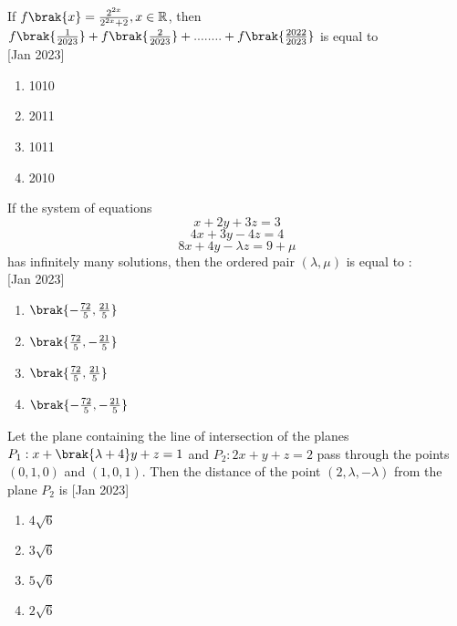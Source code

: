     \item{
     		If $f\brak{x} = \frac{2^{2x}}{2^{2x}+2}, x\in \mathbb{R}$, then $f\brak{\frac{1}{2023}}+ f\brak{\frac{2}{2023}}+........+ f\brak{\frac{2022}{2023}}$ is equal to \\ \text{ }
            \hfill
            {[Jan 2023]}
            \begin{multicols}{4}
                \begin{enumerate}
                	\item 1010
                	\item 2011
                	\item 1011
                	\item 2010
                \end{enumerate}
            \end{multicols}
        
        }
    \item{
            If the system of equations
            \[x + 2y + 3z = 3\]
            \[4x + 3y - 4z = 4\]
            \[8x + 4y - \lambda z = 9 + \mu\]
            has infinitely many solutions, then the ordered pair
            \((\lambda, \mu)\) is equal to : \\ \text{ }
           	\hfill
                {[Jan 2023]}
            
           \begin{multicols}{4}
            	\begin{enumerate}
            		\item $\brak{-\frac{72}{5},\frac{21}{5}}$
            		\item $\brak{\frac{72}{5},-\frac{21}{5}}$
            		\item $\brak{\frac{72}{5},\frac{21}{5}}$
            		\item $\brak{-\frac{72}{5},-\frac{21}{5}}$
            	\end{enumerate}
            \end{multicols}
        
        }
 	\item{
        	Let the plane containing the line of intersection of the planes $P_{1}: x + \brak{\lambda+4}y + z = 1$ and $P_{2}: 2x + y + z = 2$ pass through the points $(0, 1, 0)$ and $(1, 0, 1)$. Then the distance of the point $(2, \lambda,- \lambda)$ from the plane $P_{2}$ is
        	\hfill
        	{[Jan 2023]}
        	
        	\begin{multicols}{4}
        		\begin{enumerate}
        			\item $4\sqrt{6}$
        			\item $3\sqrt{6}$
        			\item $5\sqrt{6}$
        			\item $2\sqrt{6}$
        		\end{enumerate}
        	\end{multicols}
        	
        }
